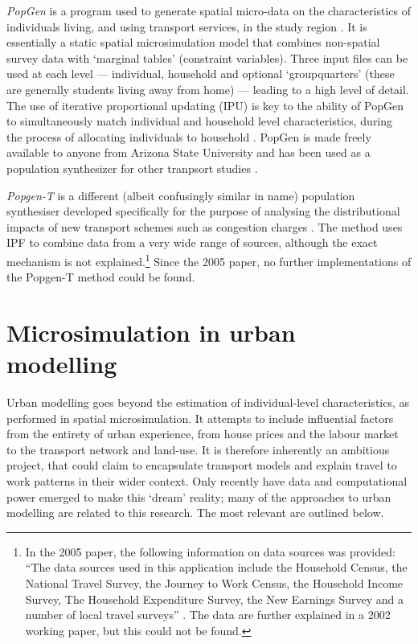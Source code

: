 \emph{PopGen} is a program used
to generate spatial micro-data on the characteristics of individuals
living, and using transport services, in the study region
\citep{Ravulaparthy2011}. It 
is essentially a static spatial microsimulation model that combines non-spatial
survey data with `marginal tables'
(constraint variables). Three input files can be used at each level ---
individual, household and optional `groupquarters'
(these are generally students living away from home) --- leading to a high level of
detail. The use of iterative proportional updating (IPU) is key to the
ability of PopGen to simultaneously match individual and household level
characteristics, during the process of allocating individuals to household
\citep{ye2009methodology}. PopGen is made freely available to
anyone from Arizona State University and has been used as a population
synthesizer for other tranpsort studies \citep{pendyala2012application}.

\emph{Popgen-T} is a different (albeit confusingly similar in name) population
synthesiser developed specifically for the purpose of analysing the
distributional impacts of new transport schemes such as congestion charges
\citep{Bonsall2005}. The method uses IPF to combine data from a very wide range
of sources, although the exact mechanism is not
explained.\footnote{In the 2005 paper, the following information on
data sources was provided: ``The data sources used in this application include the
Household Census, the National Travel Survey, the Journey to Work Census,
the Household Income Survey, The Household Expenditure Survey,
the New Earnings Survey and a number of local travel surveys'' \citep[p.~410]{Bonsall2005}.
The data are further explained in a 2002 working paper, but this could not
be found.} Since the 2005 paper, no further implementations of the Popgen-T method
could be found.




\section{Microsimulation in urban modelling}
\label{s:urbanmodel}
Urban modelling goes beyond the estimation of individual-level
characteristics, as performed in spatial microsimulation.
It attempts to include influential factors from the entirety of
urban experience, from house prices and the labour market to
the transport network and land-use. It is therefore inherently
an ambitious project, that could claim to encapsulate transport models
and explain travel to work patterns in their wider context.
Only recently have data and computational power emerged to
make this `dream' reality; many of the approaches to urban
modelling are related to this research. The most relevant are outlined below.

